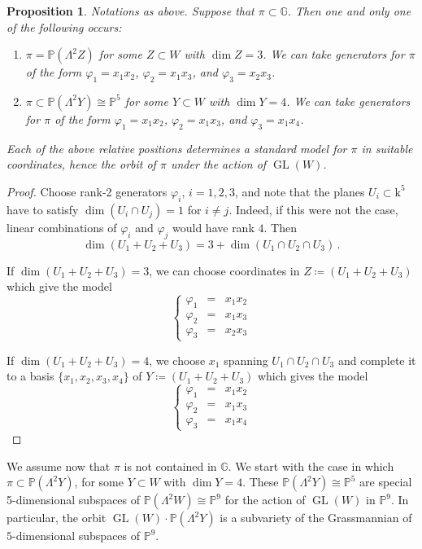 \documentclass[10pt,reqno]{amsart}
\newcommand{\GG}{\mathbb{G}}
\newcommand{\PP}{\mathbb P}
\newcommand{\GL}{\operatorname{GL}}
\newcommand{\f}{\varphi}
\renewcommand{\L}{\Lambda}
\newcommand{\kk}{\mathrm{k}}
\newtheorem{proposition}[theorem]{Proposition}
\theoremstyle{definition}
\begin{document}
\begin{proposition} \label{prop:case53-rel-positions-pi-contained-G}
Notations as above. Suppose that $\pi\subset\GG$. Then one and only one of the following occurs:
\begin{enumerate}
\item $\pi=\PP(\Lambda^2 Z)$ for some $Z\subset W$ with $\dim Z=3$. We can take generators for $\pi$ of the form $\f_1=x_1x_2$, $\f_2=x_1x_3$, and $\f_3=x_2x_3$.

\medskip

\item $\pi\subset\PP(\Lambda^2 Y)\cong\PP^5$ for some $Y\subset W$ with $\dim Y=4$. We can take generators for $\pi$ of the form $\f_1=x_1x_2$, $\f_2=x_1x_3$, and $\f_3=x_1x_4$.
\end{enumerate}
Each of the above relative positions determines a standard model for $\pi$ in suitable coordinates, hence the orbit of $\pi$ under the action of $\GL(W)$. 
\end{proposition}

\begin{proof}
Choose rank-2 generators $\f_i$, $i=1,2,3$, and note that the planes $U_i\subset\kk^5$ have to satisfy $\dim(U_i \cap U_j)=1$ for $i \ne j$. Indeed, if this were not the case, linear combinations of $\f_i$ and $\f_j$ would have rank $4$. Then
\[
\dim(U_1+U_2+U_3)=3+\dim(U_1\cap U_2\cap U_3)\,.
\]

\item If $\dim(U_1+U_2+U_3)=3$, we can choose coordinates in $Z\coloneqq(U_1+U_2+U_3)$ which give the model
\[
\left\{\begin{array}{ccl}
 \f_1 & = & x_1x_2\\
 \f_2 & = & x_1x_3\\
 \f_3 & = & x_2x_3
\end{array}\right.
\]

\item If $\dim(U_1+U_2+U_3)=4$, we choose $x_1$ spanning $U_1\cap U_2\cap U_3$ and complete it to a basis $\{x_1,x_2,x_3,x_4\}$ of $Y\coloneqq(U_1+U_2+U_3)$ which gives the model
\[
\left\{\begin{array}{ccl}
 \f_1 & = & x_1x_2\\
 \f_2 & = & x_1x_3\\
 \f_3 & = & x_1x_4
\end{array}\right.
\]
\end{proof}

\noindent We assume now that $\pi$ is not contained in $\GG$. We start with the case in which $\pi \subset \PP(\L^2Y)$, for some $Y \subset W$ with $\dim Y=4$. These $\PP(\L^2 Y) \cong \PP^5$ are special 5-dimensional subspaces of $\PP(\L^2 W) \cong \PP^9$ for the action of $\GL (W)$ in $\PP^9$. In particular, the orbit $\GL (W) \cdot \PP(\L^2 Y)$ is a subvariety of the Grassmannian of $5$-dimensional subspaces of $\PP^9$. 
\end{document}
